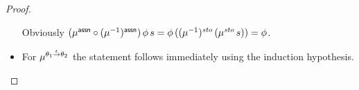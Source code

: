\documentclass[12pt,a4paper]{report}
\newcommand{\ssto}{\nstyle{sto}}
\newcommand{\id}{\nstyle{id}}
\newcommand{\Fix}[1]{\nstyle{Fix}\,(#1)}
\begin{document}
\begin{proof}
\begin{itemize}
          Obviously $(\mu^\tassn\circ(\mu^{-1})^\tassn)\,\phi\,s
            = \phi\,((\mu^{-1})^\ssto\,(\mu^\ssto\,s)) = \phi$.

    \item For $\mu^{\theta_1\stackrel{_t}{\to}\theta_2}$ the statement follows immediately using the induction hypothesis.
%
%
  \end{itemize}
\end{proof}
\end{document}

